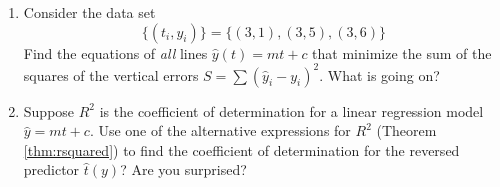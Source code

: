 \begin{exercises}{}{}
\begin{enumerate}
	  
	  \item Consider the data set
	  \[
	  	\big\{(t_i,y_i)\big\}=\big\{(3,1),(3,5),(3,6)\big\}
	  \]
	  Find the equations of \emph{all} lines $\hat y(t)=mt+c$ that minimize the sum of the squares of the vertical errors $S=\sum(\hat y_i-y_i)^2$. What is going on?
	
	  
	  \item Suppose $R^2$ is the coefficient of determination for a linear regression model $\hat y=mt+c$. Use one of the alternative expressions for $R^2$ (Theorem \ref{thm:rsquared}) to find the coefficient of determination for the reversed predictor $\hat t(y)$? Are you surprised?
	  	  

\end{enumerate}
\end{exercises}
